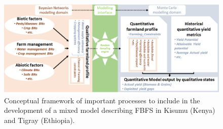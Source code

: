\documentclass[12pt,oneside]{article}
\begin{document}
\begin{figure}
\includegraphics[width=1\linewidth]{figures/Modelling_FBFS_conceptual_framework} \caption{\label{figures:figure_2}Conceptual framework of important processes to include in the development of a mixed model describing FBFS in Kisumu (Kenya) and Tigray (Ethiopia).}\label{fig:figure_2}
\end{figure}
\end{document}
